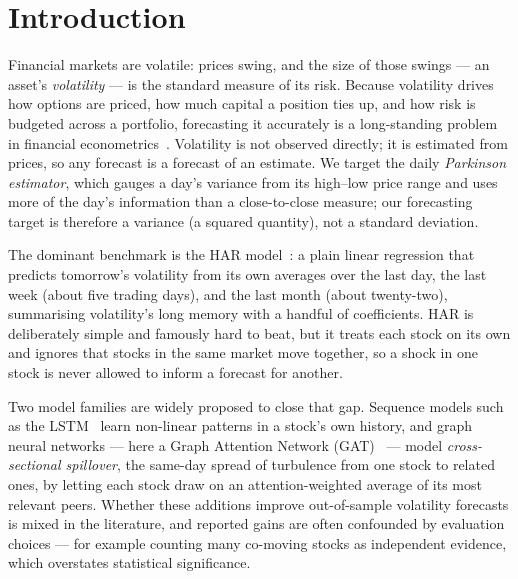 \documentclass[runningheads]{llncs}
\begin{document}
\section{Introduction}
Financial markets are volatile: prices swing, and the size of those swings --- an asset's
\emph{volatility} --- is the standard measure of its risk. Because volatility drives how options
are priced, how much capital a position ties up, and how risk is budgeted across a portfolio,
forecasting it accurately is a long-standing problem in financial econometrics~\cite{corsi2009}.
Volatility is not observed directly; it is estimated from prices, so any forecast is a forecast of
an estimate. We target the daily \emph{Parkinson estimator}, which gauges a day's variance from its
high--low price range and uses more of the day's information than a close-to-close measure; our
forecasting target is therefore a variance (a squared quantity), not a standard deviation.

The dominant benchmark is the HAR model~\cite{corsi2009}: a plain linear regression that predicts
tomorrow's volatility from its own averages over the last day, the last week (about five trading
days), and the last month (about twenty-two), summarising volatility's long memory with a handful
of coefficients. HAR is deliberately simple and famously hard to beat, but it treats each stock on
its own and ignores that stocks in the same market move together, so a shock in one stock is never
allowed to inform a forecast for another.

Two model families are widely proposed to close that gap. Sequence models such as the
LSTM~\cite{lstm1997} learn non-linear patterns in a stock's own history, and graph neural networks
--- here a Graph Attention Network (GAT)~\cite{gat2018} --- model \emph{cross-sectional spillover},
the same-day spread of turbulence from one stock to related ones, by letting each stock draw on an
attention-weighted average of its most relevant peers. Whether these additions improve
out-of-sample volatility forecasts is mixed in the literature, and reported gains are often
confounded by evaluation choices --- for example counting many co-moving stocks as independent
evidence, which overstates statistical significance.
\end{document}
